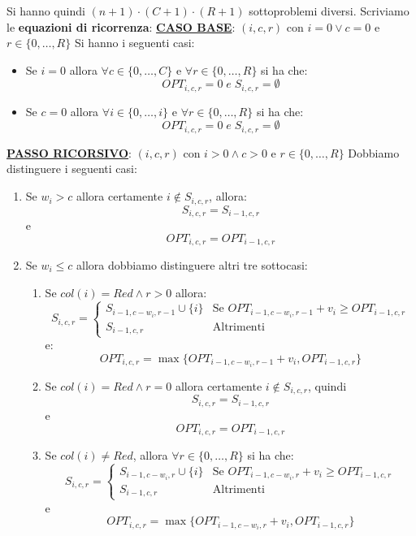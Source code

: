 \documentclass[12pt]{article}
\begin{document}
Si hanno quindi $(n+1) \cdot (C+1) \cdot (R+1)$ sottoproblemi diversi.
Scriviamo le \textbf{equazioni di ricorrenza}: \newline
\textbf{\underline{CASO BASE}}: $(i,c,r)$ con $i = 0 \vee c = 0$ e $r \in \{0,\dots, R\}$ \newline
Si hanno i seguenti casi:
\begin{itemize}
    \item Se $i = 0$ allora $\forall c \in \{0, \dots, C\}$ e $\forall r \in \{0, \dots, R\}$ si ha che:
    $$OPT_{i,c,r} = 0 \; e \; S_{i,c,r} = \emptyset$$
    \item Se $c = 0$ allora $\forall i \in \{0, \dots, i\}$ e $\forall r \in \{0, \dots, R\}$ si ha che:
    $$OPT_{i,c,r} = 0 \; e \; S_{i,c,r} = \emptyset$$
\end{itemize}
\textbf{\underline{PASSO RICORSIVO}}: $(i,c,r)$ con $i > 0 \land c > 0$ e $r \in \{0, \dots, R\}$ \newline
Dobbiamo distinguere i seguenti casi:
\begin{enumerate}
    \item Se $w_i > c$ allora certamente $i \notin S_{i,c,r}$, allora:
    $$S_{i,c,r} = S_{i-1, c, r}$$
    e 
    $$OPT_{i,c,r} = OPT_{i-1, c, r}$$
    \item Se $w_i \leq c$ allora dobbiamo distinguere altri tre sottocasi:
    \begin{enumerate}
        \item Se $col(i) = Red \land r > 0$ allora:
        \begin{equation*}
            S_{i,c,r} = \begin{cases}
                S_{i-1, c-w_i, r-1} \cup \{i\} & \textrm{Se } OPT_{i-1, c-w_i, r-1} + v_i \geq OPT_{i-1, c, r} \\
                S_{i-1, c, r} & \textrm{Altrimenti}
            \end{cases}
        \end{equation*}
        e:
        $$OPT_{i,c,r} = \max\{OPT_{i-1, c-w_i, r-1} + v_i, OPT_{i-1, c, r}\}$$
        \item Se $col(i) = Red \land r = 0$ allora certamente $i \notin S_{i,c,r}$, quindi
        $$S_{i,c,r} = S_{i-1, c, r}$$
        e
        $$OPT_{i,c,r} = OPT_{i-1, c, r}$$
        \item Se $col(i) \neq Red$, allora $\forall r \in \{0, \dots, R\}$ si ha che:
        \begin{equation*}
            S_{i,c,r} = \begin{cases}
                S_{i-1, c-w_i, r} \cup \{i\} & \textrm{Se } OPT_{i-1, c-w_i, r} + v_i \geq OPT_{i-1, c, r} \\
                S_{i-1, c, r} & \textrm{Altrimenti}
            \end{cases}
        \end{equation*} 
        e
        $$OPT_{i,c,r} = \max\{OPT_{i-1, c-w_i, r} + v_i, OPT_{i-1, c, r}\}$$
    \end{enumerate}
\end{enumerate}
\end{document}
